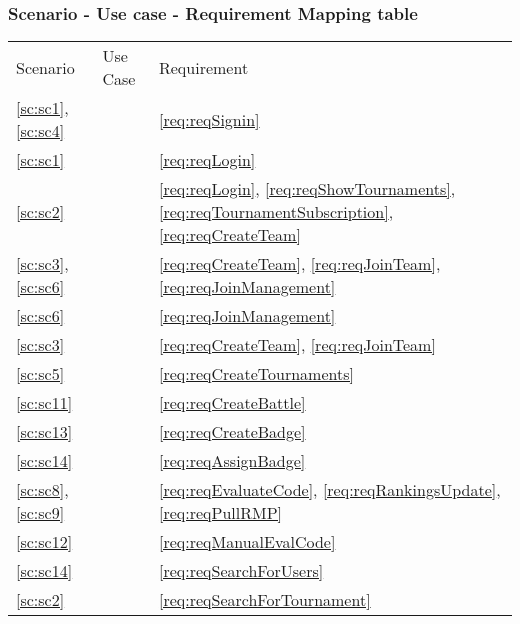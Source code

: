 \subsubsection{Scenario - Use case - Requirement Mapping table}
\begin{center}
    \begin{tabu}{|X[.2]|X[.6]|X[.2]|} \hline \everyrow{\hline}
        Scenario & Use Case & Requirement \\
        \ref{sc:sc1}, \ref{sc:sc4} &  & \ref{req:reqSignin} \\
        \ref{sc:sc1} &  & \ref{req:reqLogin} \\
        \ref{sc:sc2} &  & \ref{req:reqLogin}, \ref{req:reqShowTournaments}, \ref{req:reqTournamentSubscription}, \ref{req:reqCreateTeam}\\
        \ref{sc:sc3}, \ref{sc:sc6} &  & \ref{req:reqCreateTeam}, \ref{req:reqJoinTeam}, \ref{req:reqJoinManagement} \\
        \ref{sc:sc6} &  & \ref{req:reqJoinManagement} \\
        \ref{sc:sc3} &  & \ref{req:reqCreateTeam}, \ref{req:reqJoinTeam} \\
        \ref{sc:sc5} &  & \ref{req:reqCreateTournaments} \\
        \ref{sc:sc11} &  & \ref{req:reqCreateBattle} \\
        \ref{sc:sc13} &  & \ref{req:reqCreateBadge} \\
        \ref{sc:sc14} &  & \ref{req:reqAssignBadge} \\
        \ref{sc:sc8}, \ref{sc:sc9} &  & \ref{req:reqEvaluateCode}, \ref{req:reqRankingsUpdate}, \ref{req:reqPullRMP} \\
        \ref{sc:sc12} &  & \ref{req:reqManualEvalCode} \\
        \ref{sc:sc14} &  & \ref{req:reqSearchForUsers} \\
        \ref{sc:sc2} &  & \ref{req:reqSearchForTournament} \\
    \end{tabu}
\end{center}